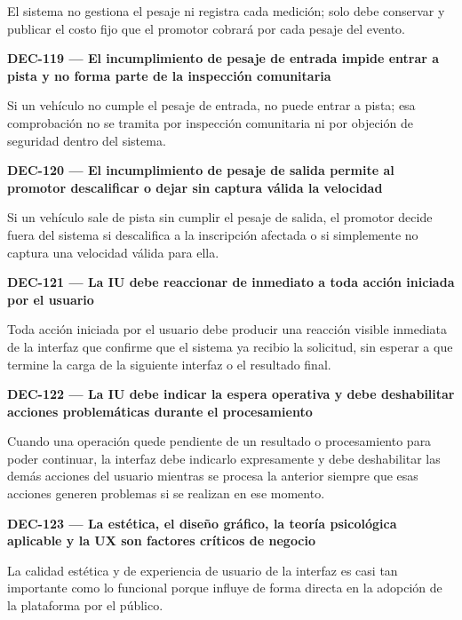 \documentclass[10pt,letterpaper]{article}
\begin{document}
El sistema no gestiona el pesaje ni registra cada medición; solo debe conservar y publicar el costo fijo que el promotor cobrará por cada pesaje del evento.\par\vspace{0.45em}
\noindent\textbf{DEC-119 --- El incumplimiento de pesaje de entrada impide entrar a pista y no forma parte de la inspección comunitaria}\par
Si un vehículo no cumple el pesaje de entrada, no puede entrar a pista; esa comprobación no se tramita por inspección comunitaria ni por objeción de seguridad dentro del sistema.\par\vspace{0.45em}
\noindent\textbf{DEC-120 --- El incumplimiento de pesaje de salida permite al promotor descalificar o dejar sin captura válida la velocidad}\par
Si un vehículo sale de pista sin cumplir el pesaje de salida, el promotor decide fuera del sistema si descalifica a la inscripción afectada o si simplemente no captura una velocidad válida para ella.\par\vspace{0.45em}
\noindent\textbf{DEC-121 --- La IU debe reaccionar de inmediato a toda acción iniciada por el usuario}\par
Toda acción iniciada por el usuario debe producir una reacción visible inmediata de la interfaz que confirme que el sistema ya recibio la solicitud, sin esperar a que termine la carga de la siguiente interfaz o el resultado final.\par\vspace{0.45em}
\noindent\textbf{DEC-122 --- La IU debe indicar la espera operativa y debe deshabilitar acciones problemáticas durante el procesamiento}\par
Cuando una operación quede pendiente de un resultado o procesamiento para poder continuar, la interfaz debe indicarlo expresamente y debe deshabilitar las demás acciones del usuario mientras se procesa la anterior siempre que esas acciones generen problemas si se realizan en ese momento.\par\vspace{0.45em}
\noindent\textbf{DEC-123 --- La estética, el diseño gráfico, la teoría psicológica aplicable y la UX son factores críticos de negocio}\par
La calidad estética y de experiencia de usuario de la interfaz es casi tan importante como lo funcional porque influye de forma directa en la adopción de la plataforma por el público.\par\vspace{0.45em}
\end{document}
